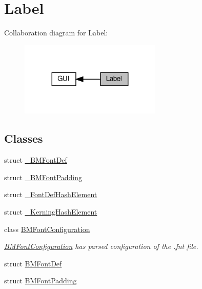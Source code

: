 \hypertarget{group__label}{}\section{Label}
\label{group__label}
Collaboration diagram for Label\+:
\nopagebreak
\begin{figure}[H]
\begin{center}
\leavevmode
\includegraphics[width=191pt]{group__label}
\end{center}
\end{figure}
\subsection*{Classes}
\begin{DoxyCompactItemize}
\item 
struct \hyperlink{struct__BMFontDef}{\+\_\+\+B\+M\+Font\+Def}
\item 
struct \hyperlink{struct__BMFontPadding}{\+\_\+\+B\+M\+Font\+Padding}
\item 
struct \hyperlink{struct__FontDefHashElement}{\+\_\+\+Font\+Def\+Hash\+Element}
\item 
struct \hyperlink{struct__KerningHashElement}{\+\_\+\+Kerning\+Hash\+Element}
\item 
class \hyperlink{classBMFontConfiguration}{B\+M\+Font\+Configuration}
\begin{DoxyCompactList}\small\item\em \hyperlink{classBMFontConfiguration}{B\+M\+Font\+Configuration} has parsed configuration of the .fnt file. \end{DoxyCompactList}\item 
struct \hyperlink{structBMFontDef}{B\+M\+Font\+Def}
\item 
struct \hyperlink{structBMFontPadding}{B\+M\+Font\+Padding}
\end{DoxyCompactItemize}
